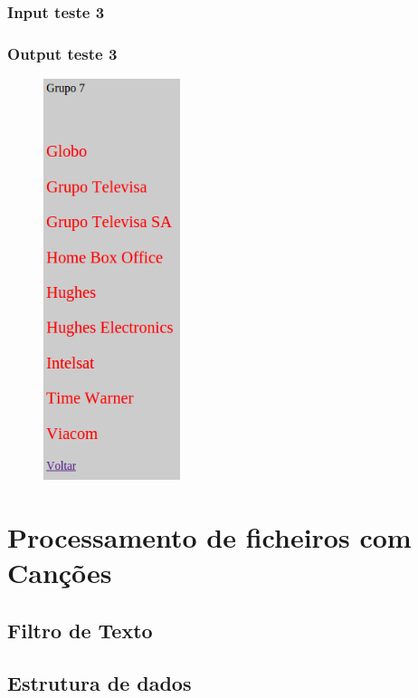 \subsubsection{Input teste 3}
\label{seq:anex-enamex-test-in03}


\subsubsection{Output teste 3}
\label{seq:anex-enamex-test-out03}

\begin{figure}[H]
\centering
\includegraphics[width=4cm]{anexos/2-2/output_teste3.png}
\end{figure}






\section{Processamento de ficheiros com Canções}
\label{seq:anex-music}

\subsection{Filtro de Texto}
\label{seq:anex-music-filtro}


\subsection{Estrutura de dados}
\label{seq:anex-music-est}


